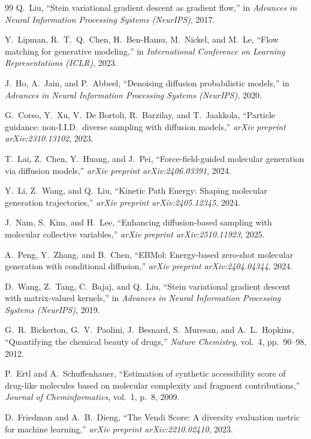 \documentclass[a4paper,11pt]{article}
\begin{document}
\begin{thebibliography}{99}
Q.~Liu,
``Stein variational gradient descent as gradient flow,''
in \emph{Advances in Neural Information Processing Systems (NeurIPS)}, 2017.

Y.~Lipman, R.~T.~Q.~Chen, H.~Ben-Hamu, M.~Nickel, and M.~Le,
``Flow matching for generative modeling,''
in \emph{International Conference on Learning Representations (ICLR)}, 2023.

J.~Ho, A.~Jain, and P.~Abbeel,
``Denoising diffusion probabilistic models,''
in \emph{Advances in Neural Information Processing Systems (NeurIPS)}, 2020.

G.~Corso, Y.~Xu, V.~De Bortoli, R.~Barzilay, and T.~Jaakkola,
``Particle guidance: non-I.I.D.\ diverse sampling with diffusion models,''
\emph{arXiv preprint arXiv:2310.13102}, 2023.

T.~Lai, Z.~Chen, Y.~Huang, and J.~Pei,
``Force-field-guided molecular generation via diffusion models,''
\emph{arXiv preprint arXiv:2406.03391}, 2024.

Y.~Li, Z.~Wang, and Q.~Liu,
``Kinetic Path Energy: Shaping molecular generation trajectories,''
\emph{arXiv preprint arXiv:2405.12345}, 2024.

J.~Nam, S.~Kim, and H.~Lee,
``Enhancing diffusion-based sampling with molecular collective variables,''
\emph{arXiv preprint arXiv:2510.11923}, 2025.

A.~Peng, Y.~Zhang, and B.~Chen,
``EBMol: Energy-based zero-shot molecular generation with conditional
diffusion,''
\emph{arXiv preprint arXiv:2404.04344}, 2024.

D.~Wang, Z.~Tang, C.~Bajaj, and Q.~Liu,
``Stein variational gradient descent with matrix-valued kernels,''
in \emph{Advances in Neural Information Processing Systems (NeurIPS)}, 2019.

G.~R.~Bickerton, G.~V.~Paolini, J.~Besnard, S.~Muresan, and A.~L.~Hopkins,
``Quantifying the chemical beauty of drugs,''
\emph{Nature Chemistry}, vol.~4, pp.~90--98, 2012.

P.~Ertl and A.~Schuffenhauer,
``Estimation of synthetic accessibility score of drug-like molecules based on
molecular complexity and fragment contributions,''
\emph{Journal of Cheminformatics}, vol.~1, p.~8, 2009.

D.~Friedman and A.~B.~Dieng,
``The Vendi Score: A diversity evaluation metric for machine learning,''
\emph{arXiv preprint arXiv:2210.02410}, 2023.


\end{thebibliography}
\end{document}
